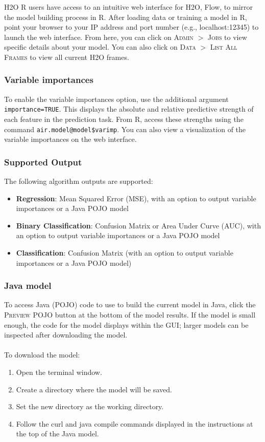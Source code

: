 \documentclass{article}[11pt]
\begin{document}
{H2O R users have access to an intuitive web interface for H2O, Flow, to mirror the model building process in R. After loading data or training a model in R, point your browser to your IP address and port number (e.g., localhost:12345) to launch the web interface. From here, you can click on \textsc{Admin} $>$ \textsc{Jobs} to view specific details about your model. You can also click on \textsc{Data} $>$ \textsc{List All Frames} to view all current H2O frames. 

\subsubsection{Variable importances} 

To enable the variable importances option, use the additional argument \texttt{importance=TRUE}. This displays the absolute and relative predictive strength of each feature in the prediction task. From R, access these strengths using the command \texttt{air.model@model\$varimp}. You can also view a visualization of the variable
importances on the web interface.

\subsubsection{Supported Output}

The following algorithm outputs are supported: 
\begin{itemize}
\item {\bf{Regression}}: Mean Squared Error (MSE), with an option to output variable importances or a Java POJO model
\item {\bf{Binary Classification}}: Confusion Matrix or Area Under Curve (AUC), with an option to output variable importances or a Java POJO model
\item {\bf{Classification}}: Confusion Matrix (with an option to output variable importances or a Java POJO model)
\end{itemize}

\subsubsection{Java model}  

To access Java (POJO) code to use to build the current model in Java, click the \textsc{Preview POJO} button at the bottom of the model results. If the model is small enough, the code for the model displays within the GUI; larger models can be inspected after downloading the model.
\\
\\
To download the model: 
\begin{enumerate}
\item Open the terminal window.
\item Create a directory where the model will be saved.
\item Set the new directory as the working directory.
\item Follow the curl and java compile commands displayed in the instructions at the top of the Java model.
\end{enumerate}

}
\end{document}
